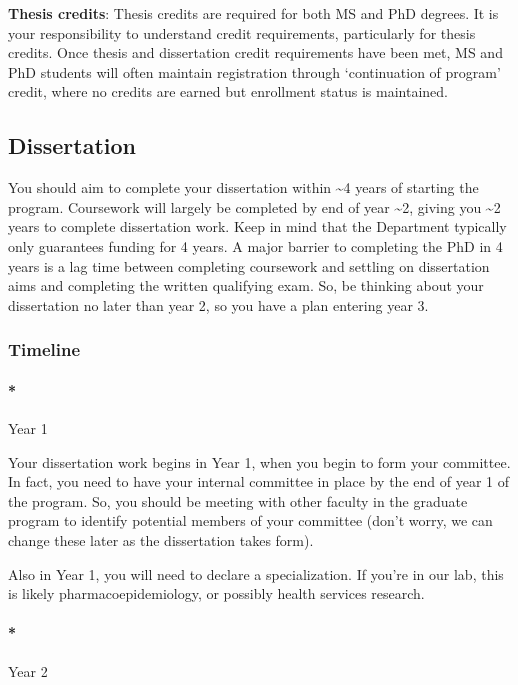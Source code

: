 \documentclass[
  letterpaper,
  DIV=11,
  numbers=noendperiod]{scrreprt}
\let\oldparagraph\paragraph
\renewcommand{\paragraph}[1]{\oldparagraph{#1}\mbox{}}
\begin{document}
\textbf{Thesis credits}: Thesis credits are required for both MS and PhD
degrees. It is your responsibility to understand credit requirements,
particularly for thesis credits. Once thesis and dissertation credit
requirements have been met, MS and PhD students will often maintain
registration through `continuation of program' credit, where no credits
are earned but enrollment status is maintained.

\hypertarget{dissertation}{%
\subsection{Dissertation}\label{dissertation}}

You should aim to complete your dissertation within \textasciitilde4
years of starting the program. Coursework will largely be completed by
end of year \textasciitilde2, giving you \textasciitilde2 years to
complete dissertation work. Keep in mind that the Department typically
only guarantees funding for 4 years. A major barrier to completing the
PhD in 4 years is a lag time between completing coursework and settling
on dissertation aims and completing the written qualifying exam. So, be
thinking about your dissertation no later than year 2, so you have a
plan entering year 3.

\hypertarget{timeline}{%
\subsubsection{Timeline}\label{timeline}}

\hypertarget{year-1}{%
\paragraph*{Year 1}\label{year-1}}

Your dissertation work begins in Year 1, when you begin to form your
committee. In fact, you need to have your internal committee in place by
the end of year 1 of the program. So, you should be meeting with other
faculty in the graduate program to identify potential members of your
committee (don't worry, we can change these later as the dissertation
takes form).

Also in Year 1, you will need to declare a specialization. If you're in
our lab, this is likely pharmacoepidemiology, or possibly health
services research.

\hypertarget{year-2}{%
\paragraph*{Year 2}\label{year-2}}
\end{document}
